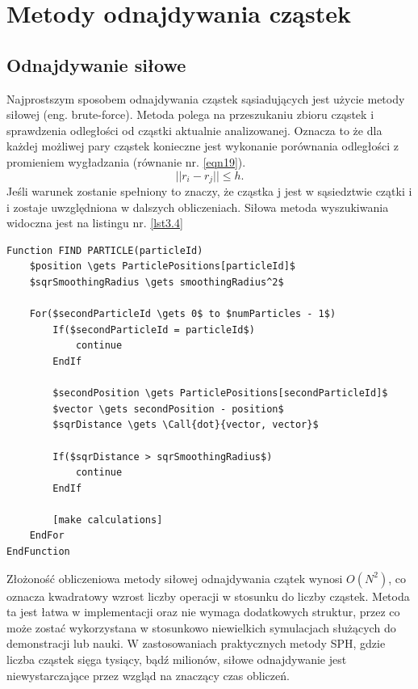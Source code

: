 \documentclass{article}
\begin{document}
\newpage
\section{Metody odnajdywania cząstek}
\subsection{Odnajdywanie siłowe}
Najprostszym sposobem odnajdywania cząstek sąsiadujących jest użycie metody siłowej (eng. brute-force). 
Metoda polega na przeszukaniu zbioru cząstek i sprawdzenia odległości od cząstki aktualnie analizowanej.\newline
Oznacza to że dla każdej możliwej pary cząstek konieczne jest wykonanie porównania odległości z promieniem wygładzania (równanie nr. \ref{eqn19}).\newline
\begin{equation}\label{eqn19}
||r_i-r_j|| \leq h.
\end{equation}
\noindent
Jeśli warunek zostanie spełniony to znaczy, że cząstka j jest w sąsiedztwie czątki i i zostaje uwzględniona w dalszych obliczeniach.\newline
\noindent
Siłowa metoda wyszukiwania widoczna jest na listingu nr. \ref{lst3.4}\newline

\begin{lstlisting}[language=Pseudocode,mathescape=true,caption=Example Listing,label={lst3.4}]
Function FIND PARTICLE(particleId)
    $position \gets ParticlePositions[particleId]$
    $sqrSmoothingRadius \gets smoothingRadius^2$

    For($secondParticleId \gets 0$ to $numParticles - 1$)
        If($secondParticleId = particleId$)
            continue
        EndIf

        $secondPosition \gets ParticlePositions[secondParticleId]$
        $vector \gets secondPosition - position$
        $sqrDistance \gets \Call{dot}{vector, vector}$

        If($sqrDistance > sqrSmoothingRadius$)
            continue
        EndIf

        [make calculations]
    EndFor
EndFunction
\end{lstlisting}



Złożoność obliczeniowa metody siłowej odnajdywania czątek wynosi $O(N^2)$, co oznacza kwadratowy wzrost liczby operacji w stosunku do liczby cząstek.\newline
Metoda ta jest łatwa w implementacji oraz nie wymaga dodatkowych struktur, przez co może zostać wykorzystana w stosunkowo niewielkich symulacjach służących do demonstracji lub nauki.\newline
W zastosowaniach praktycznych metody SPH, gdzie liczba cząstek sięga tysiący, bądź milionów, siłowe odnajdywanie jest niewystarczające przez wzgląd na znaczący czas obliczeń.\newline
\end{document}
